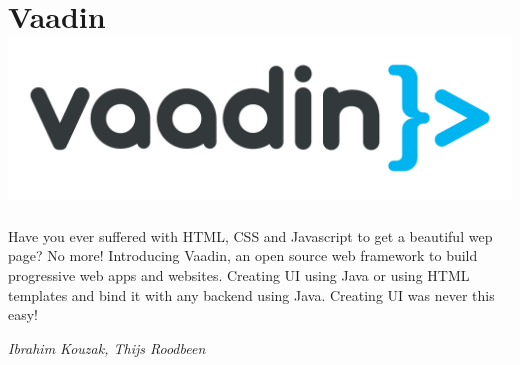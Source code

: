 \section*{Vaadin\hfill\includegraphics[width=.35\linewidth]{images/Vaadin.png}}

Have you ever suffered with HTML, CSS and Javascript to get a beautiful wep page? No more! Introducing Vaadin, an open source web framework to build progressive web apps and websites. Creating UI using Java or using HTML templates and bind it with any backend using Java. Creating UI was never this easy!

\hfill\textit{Ibrahim Kouzak, Thijs Roodbeen}